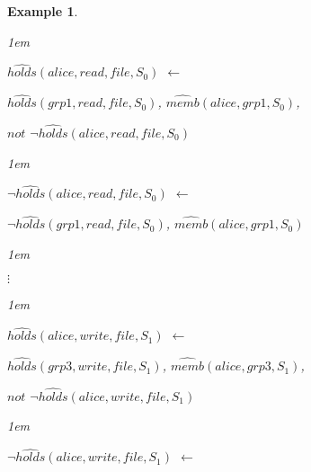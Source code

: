 \documentclass[11pt]{report}
\newtheorem{vexample}{Example}[chapter]
\newenvironment{vquote}
{
  \begin{list}{}{\leftmargin 1em}\item[]
}
{
  \end{list}
}
\begin{document}
\begin{vexample}
\begin{enumerate}
                \begin{vquote}
                  $\hat{holds}(alice, read, file, S_{0})$ $\leftarrow$
               
                  \hspace{1em}
                  $\hat{holds}(grp1, read, file, S_{0})$,
                  $\hat{memb}(alice, grp1, S_{0})$,
               
                  \hspace{1em}
                  $not$ $\lnot\hat{holds}(alice, read, file, S_{0})$
                \end{vquote}
               
                \begin{vquote}
                  $\lnot\hat{holds}(alice, read, file, S_{0})$ $\leftarrow$
               
                  \hspace{1em}
                  $\lnot\hat{holds}(grp1, read, file, S_{0})$,
                  $\hat{memb}(alice, grp1, S_{0})$
                \end{vquote}
               
                \begin{vquote}
                  \hspace{2em}$\vdots$
                \end{vquote}
               
                \begin{vquote}
                  $\hat{holds}(alice, write, file, S_{1})$ $\leftarrow$
               
                  \hspace{1em}
                  $\hat{holds}(grp3, write, file, S_{1})$,
                  $\hat{memb}(alice, grp3, S_{1})$,
               
                  \hspace{1em}
                  $not$ $\lnot\hat{holds}(alice, write, file, S_{1})$
                \end{vquote}

                \begin{vquote}
                  $\lnot\hat{holds}(alice, write, file, S_{1})$ $\leftarrow$
               

\end{vquote}
\end{enumerate}
\end{vexample}
\end{document}
